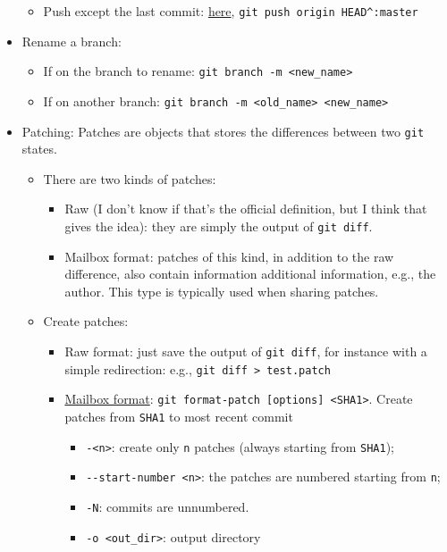 \documentclass[a4paper,12pt,%
              final%
              ]{article}
\begin{document}
\begin{itemize}
\begin{itemize}
      \item Push except the last commit: \href{https://stackoverflow.com/questions/8879375/git-push-push-all-commits-except-the-last-one}{here}, \verb|git push origin HEAD^:master|
    \end{itemize}
  \item Rename a branch:
    \begin{itemize}
      \item If on the branch to rename: \verb|git branch -m <new_name>|
      \item If on another branch: \verb|git branch -m <old_name> <new_name>|
    \end{itemize}
  \item Patching: Patches are objects that stores the differences between two \texttt{git} states.
    \begin{itemize}
      \item There are two kinds of patches:
        \begin{itemize}
          \item Raw (I don't know if that's the official definition, but I think that gives the idea): they are simply the output of \verb|git diff|.
          \item Mailbox format: patches of this kind, in addition to the raw difference, also contain information additional information, e.g., the author. This type is typically used when sharing patches.
        \end{itemize}
      \item Create patches:
        \begin{itemize}
          \item Raw format: just save the output of \verb|git diff|, for instance with a simple redirection: e.g., \verb|git diff > test.patch|
          \item \href{https://git-scm.com/docs/git-format-patch}{Mailbox format}: \verb|git format-patch [options] <SHA1>|. Create patches from \texttt{SHA1} to most recent commit
            \begin{itemize}
              \item \texttt{-<n>}: create only \texttt{n} patches (always starting from \texttt{SHA1});
              \item \verb|--start-number <n>|: the patches are numbered starting from \texttt{n};
              \item \texttt{-N}: commits are unnumbered.
              \item \verb|-o <out_dir>|: output directory

\end{itemize}
\end{itemize}
\end{itemize}
\end{itemize}
\end{document}
